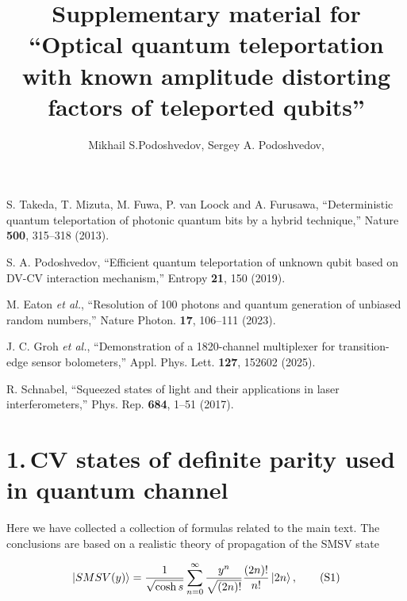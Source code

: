 \documentclass{optica-article}
\begin{document}
\begin{thebibliography}{99}
         S. Takeda, T. Mizuta, M. Fuwa, P. van Loock and A. Furusawa, ``Deterministic quantum teleportation of photonic quantum bits by a hybrid technique,'' Nature {\bf 500}, 315--318 (2013).
        
         S. A. Podoshvedov, ``Efficient quantum teleportation of unknown qubit based on DV-CV interaction mechanism,'' Entropy {\bf 21}, 150 (2019).
        
         M. Eaton {\it et al.}, ``Resolution of 100 photons and quantum generation of unbiased random numbers,'' Nature Photon. {\bf 17}, 106--111 (2023).
        
         J. C. Groh {\it et al.}, ``Demonstration of a 1820-channel multiplexer for transition-edge sensor bolometers,'' Appl. Phys. Lett. {\bf 127}, 152602 (2025).
        
         R. Schnabel, ``Squeezed states of light and their applications in laser interferometers,'' Phys. Rep. {\bf 684}, 1--51 (2017).
        
	\end{thebibliography}



\newpage

\title{Supplementary material for “Optical quantum teleportation with known amplitude distorting factors of teleported qubits”}


\author{Mikhail S.Podoshvedov, Sergey A. Podoshvedov,}

\address{Laboratory of quantum information processing and quantum computing, South Ural State University (SUSU), Lenin Av. 76, Chelyabinsk, Russia\\
Laboratory of quantum engineering of light, South Ural State University (SUSU), Lenin Av. 76, Chelyabinsk, Russia}


\section*{1.\,CV states of definite parity used in quantum channel}


Here we have collected a collection of formulas related to the main text. The conclusions are based on a realistic theory of propagation of the SMSV state




\begin{equation}\label{eq:S1}
    \ket{SMSV(y)} =
    \frac{1}{\sqrt{\cosh{s}}}\sum_{n=0}^{\infty} \frac{y^{n}}{\sqrt{(2n)!}}\frac{(2n)!}{n!}\ket{2n},  
    \tag{S1}
\end{equation}
\end{document}
